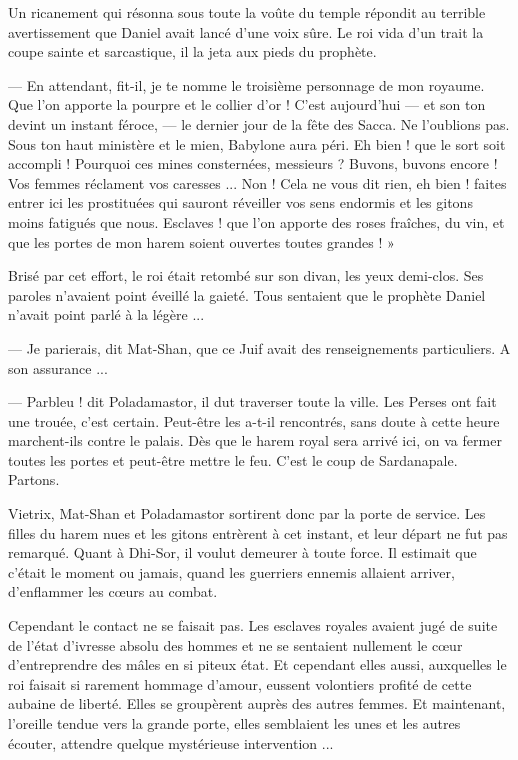\documentclass[a4paper, 11pt, oneside, polutonikogreek, french]{article}
\begin{document}
\bigskip
\centerline{\EightStarTaper}
\centerline{\EightStarTaper\EightStarTaper}
\bigskip

Un ricanement qui résonna sous toute la voûte du temple répondit au terrible avertissement que Daniel avait lancé d'une voix sûre. Le roi vida d'un trait la coupe sainte et sarcastique, il la jeta aux pieds du prophète.

--- En attendant, fit-il, je te nomme le troisième personnage de mon royaume. Que l'on apporte la pourpre et le collier d'or ! C'est aujourd'hui --- et son ton devint un instant féroce, --- le dernier jour de la fête des Sacca. Ne l'oublions pas. Sous ton haut ministère et le mien, Babylone aura péri. Eh bien ! que le sort soit accompli ! Pourquoi ces mines consternées, messieurs ? Buvons, buvons encore ! Vos femmes réclament vos caresses ... Non ! Cela ne vous dit rien, eh bien ! faites entrer ici les prostituées qui sauront réveiller vos sens endormis et les gitons moins fatigués que nous. Esclaves ! que l'on apporte des roses fraîches, du vin, et que les portes de mon harem soient ouvertes toutes grandes ! »

\bigskip
\centerline{\EightStarTaper}
\centerline{\EightStarTaper\EightStarTaper}
\bigskip

Brisé par cet effort, le roi était retombé sur son divan, les yeux demi-clos. Ses paroles n'avaient point éveillé la gaieté. Tous sentaient que le prophète Daniel n'avait point parlé à la légère ...

--- Je parierais, dit Mat-Shan, que ce Juif avait des renseignements particuliers. A son assurance ...

--- Parbleu ! dit Poladamastor, il dut traverser toute la ville. Les Perses ont fait une trouée, c'est certain. Peut-être les a-t-il rencontrés, sans doute à cette heure marchent-ils contre le palais. Dès que le harem royal sera arrivé ici, on va fermer toutes les portes et peut-être mettre le feu. C'est le coup de Sardanapale. Partons.

Vietrix, Mat-Shan et Poladamastor sortirent donc par la porte de service. Les filles du harem nues et les gitons entrèrent à cet instant, et leur départ ne fut pas remarqué. Quant à Dhi-Sor, il voulut demeurer à toute force. Il estimait que c'était le moment ou jamais, quand les guerriers ennemis allaient arriver, d'enflammer les cœurs au combat.

\bigskip
\centerline{\EightStarTaper}
\centerline{\EightStarTaper\EightStarTaper}
\bigskip

Cependant le contact ne se faisait pas. Les esclaves royales avaient jugé de suite de l'état d'ivresse absolu des hommes et ne se sentaient nullement le cœur d'entreprendre des mâles en si piteux état. Et cependant elles aussi, auxquelles le roi faisait si rarement hommage d'amour, eussent volontiers profité de cette aubaine de liberté. Elles se groupèrent auprès des autres femmes. Et maintenant, l'oreille tendue vers la grande porte, elles semblaient les unes et les autres écouter, attendre quelque mystérieuse intervention ...
\end{document}
